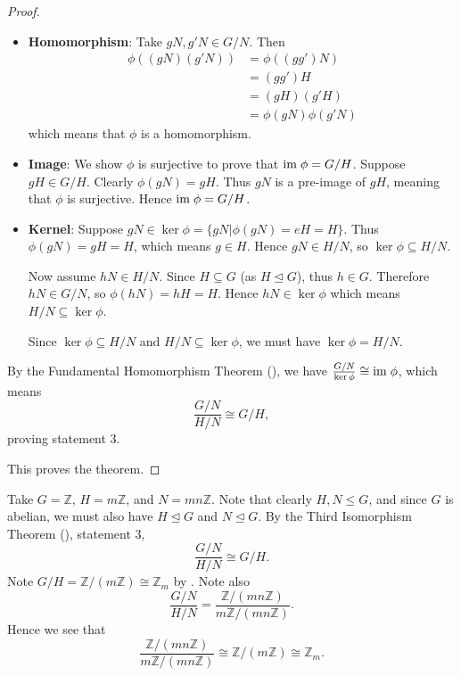 \begin{proof}
\begin{enumerate}
\begin{itemize}
            \item \textbf{Homomorphism}: Take $gN, g'N \in G/N$. Then
            \begin{align*}
                \phi((gN)(g'N)) &= \phi((gg')N)\\
                &= (gg')H\\
                &= (gH)(g'H)\\
                &= \phi(gN)\phi(g'N)
            \end{align*}
            which means that $\phi$ is a homomorphism.
            
            \item \textbf{Image}: We show $\phi$ is surjective to prove that $\mathrm{im}\;\phi = G/H$. Suppose $gH \in G/H$. Clearly $\phi(gN) = gH$. Thus $gN$ is a pre-image of $gH$, meaning that $\phi$ is surjective. Hence $\mathrm{im}\;\phi = G/H$.
            
            \item \textbf{Kernel}: Suppose $gN \in \ker\phi = \{gN \vert \phi(gN) = eH = H\}$. Thus $\phi(gN) = gH = H$, which means $g \in H$. Hence $gN \in H/N$, so $\ker\phi \subseteq H/N$.

            Now assume $hN \in H/N$. Since $H\subseteq G$ (as $H \unlhd G$), thus $h \in G$. Therefore $hN \in G/N$, so $\phi(hN) = hH = H$. Hence $hN \in \ker\phi$ which means $H/N \subseteq \ker\phi$.

            Since $\ker\phi \subseteq H/N$ and $H/N \subseteq \ker\phi$, we must have $\ker\phi = H/N$.
        \end{itemize}

        By the Fundamental Homomorphism Theorem (), we have $\frac{G/N}{\ker\phi} \cong \mathrm{im}\;\phi$, which means
        \[
            \frac{G/N}{H/N} \cong G/H,
        \]
        proving statement 3.
    \end{enumerate}
    This proves the theorem.
\end{proof}

\begin{example}
    Take $G = \mathbb{Z}$, $H = m\mathbb{Z}$, and $N = mn\mathbb{Z}$. Note that clearly $H, N \leq G$, and since $G$ is abelian, we must also have $H \unlhd G$ and $N \unlhd G$. By the Third Isomorphism Theorem (), statement 3,
    \[
        \frac{G/N}{H/N} \cong G/H.
    \]
    Note $G/H = \mathbb{Z}/(m\mathbb{Z}) \cong \mathbb{Z}_m$ by . Note also
    \[
        \frac{G/N}{H/N} = \frac{\mathbb{Z}/(mn\mathbb{Z})}{m\mathbb{Z}/(mn\mathbb{Z})}.
    \]
    Hence we see that
    \[
        \frac{\mathbb{Z}/(mn\mathbb{Z})}{m\mathbb{Z}/(mn\mathbb{Z})} \cong \mathbb{Z}/(m\mathbb{Z}) \cong \mathbb{Z}_m.
    \]
\end{example}

